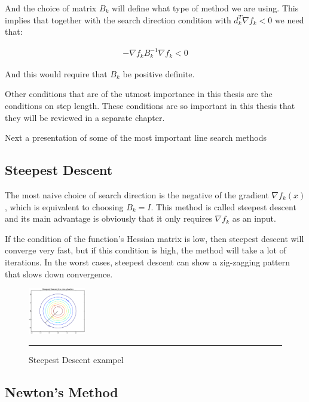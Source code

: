 And the choice of matrix $B_k$ will define what type of method we are using.  This implies that together with the search direction condition with  $d_k^T \nabla f_k < 0$ we need that:

\begin{equation} \label{Bposdef}
  \begin{aligned}
    -\nabla f_k B_k^{-1} \nabla f_k < 0
  \end{aligned}
\end{equation}

And this would require that $B_k$ be positive definite.

Other conditions that are of the utmost importance in this thesis are the conditions on step length.  These conditions are so important in this thesis that they will be reviewed in a separate chapter.  
 
Next a presentation of some  of the most important line search methods

\subsection{Steepest Descent}

The most naive choice of search direction is the negative of the gradient $\nabla f_k(x)$, which is equivalent to choosing $B_k = I$.  This method is called steepest descent and its main advantage is obviously that it only requires $\nabla f_k$ as an input.

If the condition of the function's Hessian matrix is low, then steepest descent will converge very fast,  but if this condition is high, the method will take a lot of iterations.  In the worst cases, steepest descent can show a zig-zagging pattern that slows down convergence.

\begin{figure}[htbp]
  \centering
  \includegraphics[width=2.5cm]{Figures/steepestDescentNice}
  \rule{35em}{0.1pt}
  \caption[step. Desc.]{Steepest Descent exampel}
  \label{fig:Electron}
\end{figure}

\subsection{Newton's Method}

